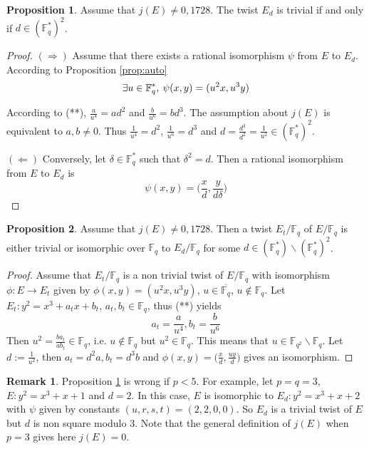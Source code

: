 \documentclass[10pt]{article}
\theoremstyle{definition}
\newtheorem{proposition}{Proposition}
\newtheorem{remark}{Remark}
\newcommand{\F}{\mathbb{F}}
\begin{document}
\begin{proposition}\label{prop:trivialtwist}
Assume that $j(E) \neq 0,1728$.
The twist $E_d$ is trivial if and only if $d \in (\F_q^*)^2$.
\end{proposition}

\begin{proof}
$(\Rightarrow)$ Assume that there exists a rational isomorphism $\psi$ from $E$ to $E_d$.
According to Proposition \ref{prop:auto}
\[ \exists u \in \F_q^*, \mkern4mu \psi(x,y) = (u^2x,u^3y) \]

According to (**), $\frac{a}{u^4} = ad^2$ and $\frac{b}{u^6} = bd^3$.
The assumption about $j(E)$ is equivalent to $a,b \neq 0$.
Thus $\frac{1}{u^4} = d^2$, $\frac{1}{u^6} = d^3$ and $d = \frac{d^3}{d^2} = \frac{1}{u^2} \in (\F_q^*)^2$.

$(\Leftarrow)$ Conversely, let $\delta \in \F_q^*$ such that $\delta^2 = d$.
Then  a rational isomorphism from $E$ to $E_d$ is
\[ \psi(x,y) = \big(\frac{x}{d},\frac{y}{d\delta}\big) \]
\end{proof}


\begin{proposition}
Assume that $j(E) \neq 0, 1728$. 
Then a twist $E_t/\F_q$ of $E/\F_q$ is either trivial or isomorphic over $\F_q$ to $E_d/\F_q$ for some $d \in (\F_q^*) \backslash (\F_q^*)^2$.
\end{proposition}
\begin{proof}
Assume that $E_t/\F_q$ is a non trivial twist of $E/\F_q$ with isomorphism $\phi : E \to E_t$ given by $\phi(x,y) = (u^2x,u^3y)$, $u \in \overline{\F_q}$, $u \notin \F_q$.
Let $E_t : y^2 = x^3 +a_tx+b_t$, $a_t,b_t \in \F_q$, thus (**) yields
\[ a_t = \frac{a}{u^4}, b_t = \frac{b}{u^6} \]
Then $u^2 = \frac{ba_t}{ab_t} \in \F_q$, i.e. $u \notin \F_q$ but $u^2 \in \F_q$.
This means that $u \in \F_{q^2} \backslash \F_q$.
Let $d := \frac{1}{u^2}$, then $a_t = d^2a, b_t = d^3b$ and $\phi(x,y) = \big(\frac{x}{d},\frac{uy}{d} \big)$ gives an isomorphism.
\end{proof}


\noindent \begin{remark}
Proposition \ref{prop:trivialtwist} is wrong if $p < 5$.
For example, let $p=q=3$, $E : y^2 = x^3 + x + 1$ and $d = 2$.
In this case, $E$ is isomorphic to $E_d : y^2 = x^3+x+2$  with $\psi$ given by constants $(u,r,s,t) = (2,2,0,0)$.
So $E_d$ is a trivial twist of $E$ but $d$ is non square modulo $3$.
Note that the general definition of $j(E)$ when $p=3$ gives here $j(E) = 0$.
\end{remark}
\end{document}
